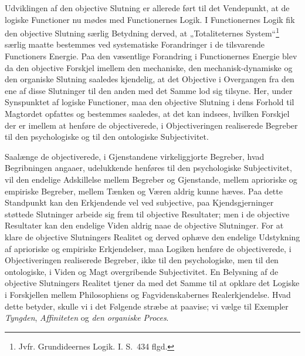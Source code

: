\documentclass[12pt]{book}
\newcommand{\opage}[1]{\marginnote{\footnotesize\textit{[#1]}}}
\begin{document}
Udviklingen af den objective Slutning er allerede ført til det Vendepunkt, at de logiske Functioner nu mødes med Functionernes Logik. I Functionernes Logik fik den objective Slutning særlig Betydning derved, at „Totaliteternes System“\footnote{Jvfr. Grundideernes Logik. I. S.~434 flgd.}%
{} særlig maatte bestemmes ved systematiske Forandringer i de tilsvarende Functioners Energie. Paa den væsentlige Forandring i Functionernes Energie blev da den objective Forskjel imellem den mechaniske, den mechanisk-dynamiske og den organiske Slutning saaledes kjendelig, at det Objective i Overgangen fra den ene af disse Slutninger til den anden med det Samme lod sig tilsyne. Her, under Synspunktet af logiske Functioner, maa den objective Slutning i dens Forhold til Magtordet opfattes og bestemmes saaledes, at det kan indsees, hvilken Forskjel der er imellem at henføre de objectiverede, i Objectiveringen realiserede Begreber til den psychologiske og til den ontologiske Subjectivitet.

\opage{409}Saalænge de objectiverede, i Gjenstandene virkeliggjorte Begreber, hvad Begribningen angaaer, udelukkende henføres til den psychologiske Subjectivitet, vil den endelige Adskillelse mellem Begreber og Gjenstande, mellem aprioriske og empiriske Begreber, mellem Tænken og Væren aldrig kunne hæves. Paa dette Standpunkt kan den Erkjendende vel ved subjective, paa Kjendsgjerninger støttede Slutninger arbeide sig frem til objective Resultater; men i de objective Resultater kan den endelige Viden aldrig naae de objective Slutninger. For at klare de objective Slutningers Realitet og derved ophæve den endelige Udstykning af aprioriske og empiriske Erkjendelser, maa Logiken henføre de objectiverede, i Objectiveringen realiserede Begreber, ikke til den psychologiske, men til den ontologiske, i Viden og Magt overgribende Subjectivitet. En Belysning af de objective Slutningers Realitet tjener da med det Samme til at opklare det Logiske i Forskjellen mellem Philosophiens og Fagvidenskabernes Realerkjendelse. Hvad dette betyder, skulle vi i det Følgende stræbe at paavise; vi vælge til Exempler \emph{Tyngden}, \emph{Affiniteten} og \emph{den organiske Proces}.
\end{document}
